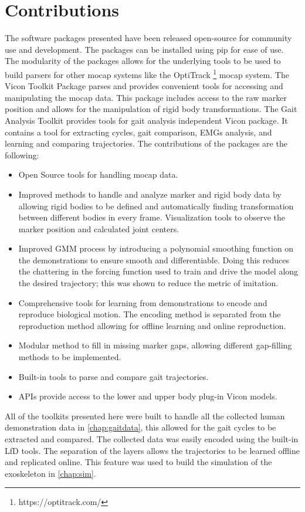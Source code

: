 \section{Contributions}

The software packages presented have been released open-source for community use and development. The packages can be installed using pip for ease of use. The modularity of the packages allows for the underlying tools to be used to build parsers for other mocap systems like the OptiTrack \footnote{https://optitrack.com/} mocap system. The Vicon Toolkit Package parses and provides convenient tools for accessing and manipulating the mocap data. This package includes access to the raw marker position and allows for the manipulation of rigid body transformations. The Gait Analysis Toolkit provides tools for gait analysis independent Vicon package. It contains a tool for extracting cycles, gait comparison, EMGs analysis, and learning and comparing trajectories. The contributions of the packages are the following:

\begin{itemize}
    \item Open Source tools for handling mocap data.
    \item Improved methods to handle and analyze marker and rigid body data by allowing rigid bodies to be defined and automatically finding transformation between different bodies in every frame.
    \iten Visualization tools to observe the marker position and calculated joint centers. 
    \item Improved GMM process by introducing a polynomial smoothing function on the demonstrations to ensure smooth and differentiable. Doing this reduces the chattering in the forcing function used to train and drive the model along the desired trajectory; this was shown to reduce the metric of imitation.
    \item Comprehensive tools for learning from demonstrations to encode and reproduce biological motion. The encoding method is separated from the reproduction method allowing for offline learning and online reproduction.
    \item Modular method to fill in missing marker gaps, allowing different gap-filling methods to be implemented. 
    \item Built-in tools to parse and compare gait trajectories. 
    \item APIs provide access to the lower and upper body plug-in Vicon models. 
\end{itemize}

All of the toolkits presented here were built to handle all the collected human demonstration data in \autoref{chap:gaitdata}, this allowed for the gait cycles to be extracted and compared. The collected data was easily encoded using the built-in LfD tools. The separation of the layers allows the trajectories to be learned offline and replicated online. This feature was used to build the simulation of the exoskeleton in \autoref{chap:sim}.

